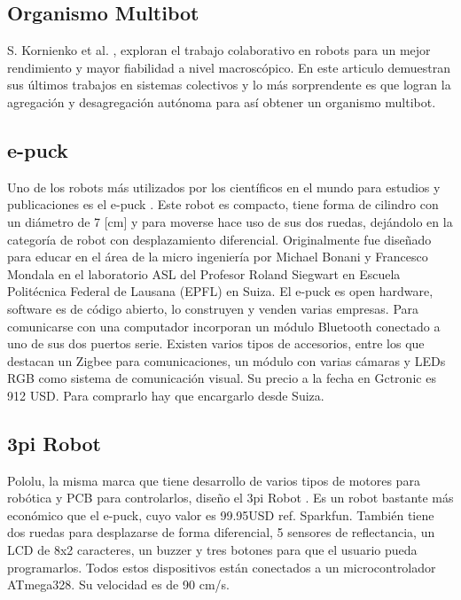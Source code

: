 \subsection{Organismo Multibot}
S. Kornienko et al. \cite{5359578}, exploran el trabajo colaborativo en robots para un mejor rendimiento y mayor fiabilidad a nivel macroscópico. En este articulo demuestran sus últimos trabajos en sistemas colectivos y lo más sorprendente es que logran la agregación y desagregación autónoma para así obtener un organismo multibot.


\subsection{e-puck}
Uno de los robots más utilizados por los científicos en el mundo para estudios y publicaciones es el e-puck \cite{mondada2009puck}. Este robot es compacto, tiene forma de cilindro con un diámetro de 7 [cm] y para moverse hace uso de sus dos ruedas, dejándolo en la categoría de robot con desplazamiento diferencial. Originalmente fue diseñado para educar en el área de la micro ingeniería por Michael Bonani y Francesco Mondala en el laboratorio ASL del Profesor Roland Siegwart en Escuela Politécnica Federal de Lausana (EPFL) en Suiza. El e-puck es open hardware, software es de código abierto,  lo construyen y venden varias empresas. Para comunicarse con una computador incorporan un módulo Bluetooth conectado a uno de sus dos puertos serie. Existen varios tipos de accesorios, entre los que destacan un Zigbee para comunicaciones, un módulo con varias cámaras y LEDs RGB como sistema de comunicación visual. Su precio a la fecha en Gctronic es 912 USD. Para comprarlo hay que encargarlo desde Suiza.

\subsection{3pi Robot}
Pololu, la misma marca que tiene desarrollo de varios tipos de motores para robótica y PCB para controlarlos, diseño el 3pi Robot \cite{thurskyusing}. Es un robot bastante más económico que el e-puck, cuyo valor es 99.95USD ref. Sparkfun. También tiene dos ruedas para desplazarse de forma diferencial, 5 sensores de reflectancia, un LCD de 8x2 caracteres, un buzzer y tres botones para que el usuario pueda programarlos. Todos estos dispositivos están conectados a un microcontrolador ATmega328. Su velocidad es de 90 cm/s.

